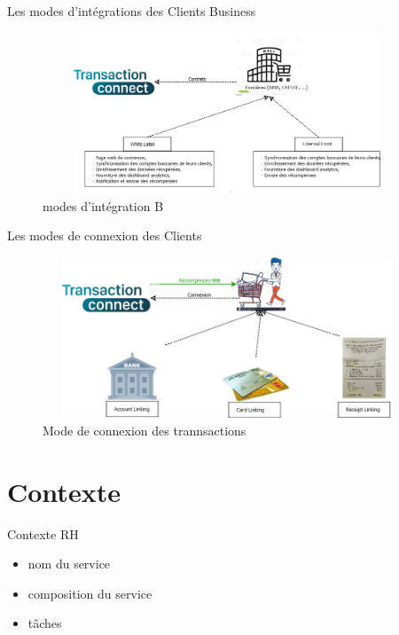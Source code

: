\documentclass[xelatex,12pt]{beamer}
\begin{document}
\begin{frame}{Les modes d'intégrations des Clients Business}
\begin{figure}[H]
    \includegraphics[width=11cm,height=4.8cm]{images/business_links.png}
    \caption{ modes d'intégration B}
    \label{fig:L1}
\end{figure}
\end{frame}
\begin{frame}{Les modes de connexion des Clients}
\begin{figure}[H]
    \includegraphics[width=11cm,height=4.8cm]{images/client_links.png}
    \caption{ Mode de connexion des trannsactions}
    \label{fig:L1}
\end{figure}
\end{frame}

\section{Contexte} %

\begin{frame}{Contexte RH}
  \begin{itemize}
  \item nom du service
  \item composition du service
  \item tâches
  \end{itemize}
\end{frame}
\end{document}
